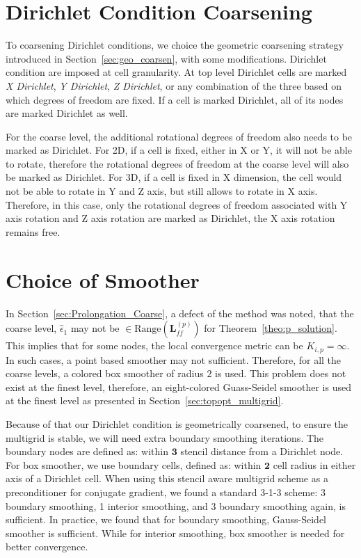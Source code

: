 \section{Dirichlet Condition Coarsening}
To coarsening Dirichlet conditions, we choice the geometric coarsening strategy introduced in Section~\ref{sec:geo_coarsen}, with some modifications. Dirichlet condition are imposed at cell granularity. At top level Dirichlet cells are marked \textit{X Dirichlet}, \textit{Y Dirichlet}, \textit{Z Dirichlet}, or any combination of the three based on which degrees of freedom are fixed. If a cell is marked Dirichlet, all of its nodes are marked Dirichlet as well. 

For the coarse level, the additional rotational degrees of freedom also needs to be marked as Dirichlet. For 2D, if a cell is fixed, either in X or Y, it will not be able to rotate, therefore the rotational degrees of freedom at the coarse level will also be marked as Dirichlet. For 3D, if a cell is fixed in X dimension, the cell would not be able to rotate in Y and Z axis, but still allows to rotate in X axis. Therefore, in this case, only the rotational degrees of freedom associated with Y axis rotation and Z axis rotation are marked as Dirichlet, the X axis rotation remains free.

\section{Choice of Smoother}
In Section~\ref{sec:Prolongation_Coarse}, a defect of the method was noted, that the coarse level,  $\hat{\epsilon}_1$ may not be $\in \text{Range}(\mathbf{L}^{(p)}_{ff})$ for Theorem~\ref{theo:p_solution}. This implies that for some nodes, the local convergence metric can be $K_{i,p} = \infty$. In such cases, a point based smoother may not sufficient. Therefore, for all the coarse levels, a colored box smoother of radius $2$ is used. This problem does not exist at the finest level, therefore, an eight-colored Guass-Seidel smoother is used at the finest level as presented in Section~\ref{sec:topopt_multigrid}. 

Because of that our Dirichlet condition is geometrically coarsened, to ensure the multigrid is stable, we will need extra boundary smoothing iterations. The boundary nodes are defined as: within $\mathbf{3}$ stencil distance from a Dirichlet node. For box smoother, we use boundary cells, defined as: within $\mathbf{2}$ cell radius in either axis of a Dirichlet cell. When using this stencil aware multigrid scheme as a preconditioner for conjugate gradient, we found a standard 3-1-3 scheme: 3 boundary smoothing, 1 interior smoothing, and 3 boundary smoothing again, is sufficient. In practice, we found that for boundary smoothing, Gauss-Seidel smoother is sufficient. While for interior smoothing, box smoother is needed for better convergence.


